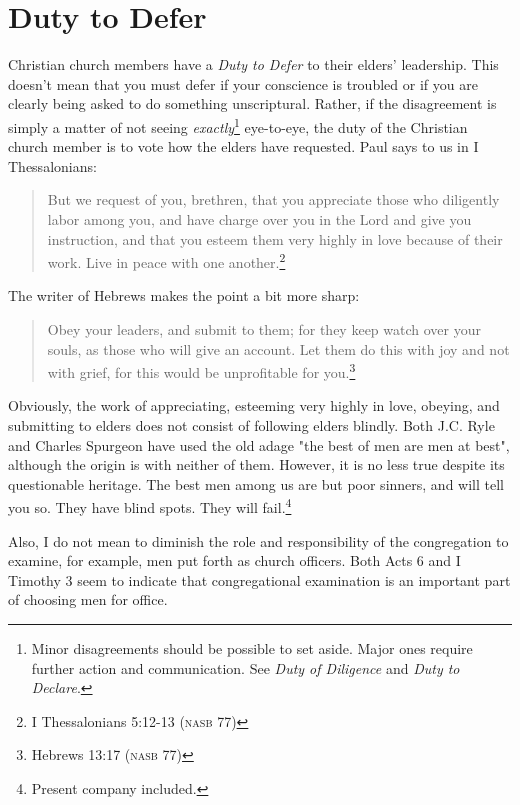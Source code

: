 \section{Duty to Defer}
Christian church members have a \textit{Duty to Defer} to their elders' leadership.  This doesn't mean that you must defer if your conscience is troubled or if you are clearly being asked to do something unscriptural.  Rather, if the disagreement is simply a matter of not seeing \textit{exactly}\footnote{Minor disagreements should be possible to set aside.  Major ones require further action and communication.  See \textit{Duty of Diligence} and \textit{Duty to Declare}.} eye-to-eye, the duty of the Christian church member is to vote how the elders have requested.  Paul says to us in I Thessalonians:
\begin{quote}
But we request of you, brethren, that you appreciate those who diligently labor among you, and have charge over you in the Lord and give you instruction, and that you esteem them very highly in love because of their work. Live in peace with one another.\footnote{I Thessalonians 5:12-13 \textsc{(nasb 77)}}
\end{quote}

\noindent
The writer of Hebrews makes the point a bit more sharp:
\begin{quote}
Obey your leaders, and submit to them; for they keep watch over your souls, as those who will give an account. Let them do this with joy and not with grief, for this would be unprofitable for you.\footnote{Hebrews 13:17 \textsc{(nasb 77)}}
\end{quote}

\noindent
Obviously, the work of appreciating, esteeming very highly in love, obeying, and submitting to elders does not consist of following elders blindly.  Both J.C. Ryle and Charles Spurgeon have used the old adage "the best of men are men at best", although the origin is with neither of them.  However, it is no less true despite its questionable heritage.  The best men among us are but poor sinners, and will tell you so.  They have blind spots.  They will fail.\footnote{Present company included.}

Also, I do not mean to diminish the role and responsibility of the congregation to examine, for example, men put forth as church officers.  Both Acts 6 and I Timothy 3 seem to indicate that congregational examination is an important part of choosing men for office.

